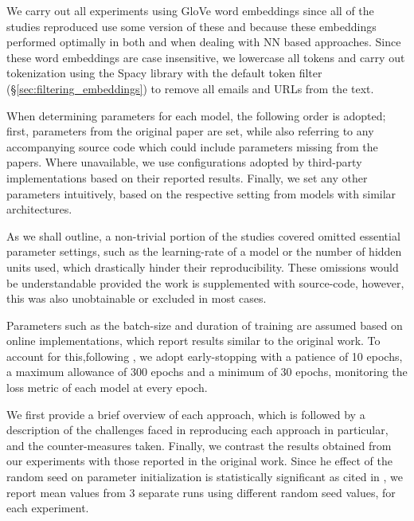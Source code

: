 \documentclass[../../fyp.tex]{subfiles}
\begin{document}
We carry out all experiments using GloVe word embeddings \cite{pennington} since all of the studies reproduced use some version of these and because these embeddings performed optimally in both \cite{moore2018} and \cite{bhuwandhingra2017} when dealing with NN based approaches. Since these word embeddings are case insensitive, we lowercase all tokens and carry out tokenization using the Spacy library with the default token filter (\S\ref{sec:filtering_embeddings}) to remove all emails and URLs from the text.

When determining parameters for each model, the following order is adopted; first, parameters from the original paper are set, while also referring to any accompanying source code which could include parameters missing from the papers. Where unavailable, we use configurations adopted by third-party implementations based on their reported results. Finally, we set any other parameters intuitively, based on the respective setting from models with similar architectures. 

As we shall outline, a non-trivial portion of the studies covered omitted essential parameter settings, such as the learning-rate of a model or the number of hidden units used, which drastically hinder their reproducibility. These omissions would be understandable provided the work is supplemented with source-code, however, this was also unobtainable or excluded in most cases.

Parameters such as the batch-size and duration of training are assumed based on online implementations, which report results similar to the original work. To account for this,following \cite{moore2018}, we adopt early-stopping with a patience of 10 epochs, a maximum allowance of 300 epochs and a minimum of 30 epochs, monitoring the loss metric of each model at every epoch. 

We first provide a brief overview of each approach, which is followed by a description of the challenges faced in reproducing each approach in particular, and the counter-measures taken. Finally, we contrast the results obtained from our experiments with those reported in the original work. Since he effect of the random seed on parameter initialization is statistically significant \cite{reimers2017} as cited in \cite{moore2018}, we report mean values from 3 separate runs using different random seed values, for each experiment. 
\end{document}
